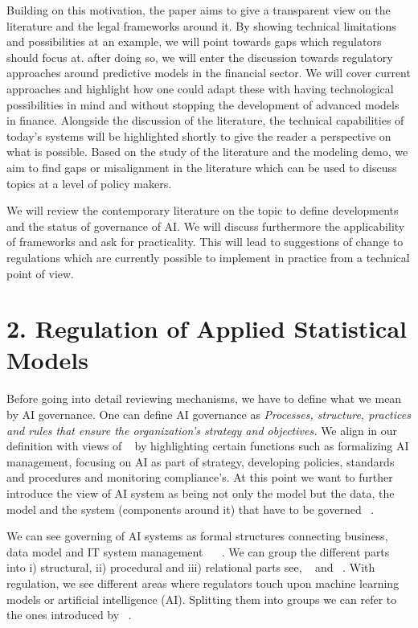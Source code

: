\documentclass[jou,apacite]{apa6}
\begin{document}
Building on this motivation, the paper aims to give a transparent view on the literature and the legal frameworks around it. By showing technical limitations and possibilities at an example, we will point towards gaps which regulators should focus at. after doing so, we will enter the discussion towards regulatory approaches around predictive models in the financial sector. We will cover current approaches and highlight how one could adapt these with having technological possibilities in mind and without stopping the development of advanced models in finance. Alongside the discussion of the literature, the technical capabilities of today’s systems will be highlighted shortly to give the reader a perspective on what is possible. Based on the study of the literature and the modeling demo, we aim to find gaps or misalignment in the literature which can be used to discuss topics at a level of policy makers.\par

We will review the contemporary literature on the topic to define developments and the status of governance of AI. We will discuss furthermore the applicability of frameworks and ask for practicality. This will lead to suggestions of change to regulations which are currently possible to implement in practice from a technical point of view.

\section{2. Regulation of Applied Statistical Models}

Before going into detail reviewing mechanisms, we have to define what we mean by AI governance. One can define AI governance as \textit{Processes, structure, practices and rules that ensure the organization’s strategy and objectives.} We align in our definition with views of ~\cite{abraham2019data} by highlighting certain functions such as formalizing AI management, focusing on AI as part of strategy, developing policies, standards and procedures and monitoring compliance’s. At this point we want to further introduce the view of AI system as being not only the model but the data, the model and the system (components around it) that have to be governed ~\cite{schn19}.\par

We can see governing of AI systems as formal structures connecting business, data model and IT system management ~\cite{schn19} ~\cite{peterson2004crafting}. We can group the different parts into i) structural, ii) procedural and iii) relational parts see, ~\cite{peterson2004crafting} and ~\cite{van2009enterprise}. With regulation, we see different areas where regulators touch upon machine learning models or artificial intelligence (AI). Splitting them into groups we can refer to the ones introduced by ~\cite{peterson2004crafting}. 
\end{document}

